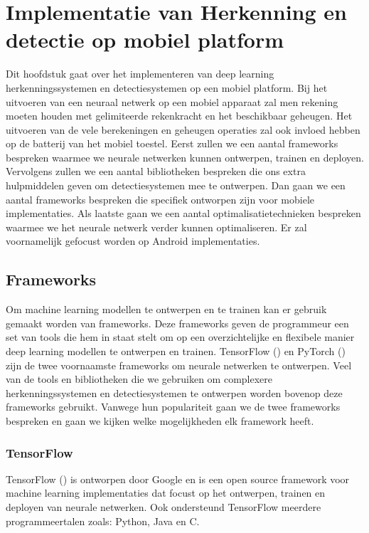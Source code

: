 \chapter{Implementatie van Herkenning en detectie op mobiel platform}
Dit hoofdstuk gaat over het implementeren van deep learning herkenningssystemen en detectiesystemen op een mobiel platform.
Bij het uitvoeren van een neuraal netwerk op een mobiel apparaat zal men rekening moeten houden met gelimiteerde rekenkracht en het beschikbaar geheugen.
Het uitvoeren van de vele berekeningen en geheugen operaties zal ook invloed hebben op de batterij van het mobiel toestel.
Eerst zullen we een aantal frameworks bespreken waarmee we neurale netwerken kunnen ontwerpen, trainen en deployen.
Vervolgens zullen we een aantal bibliotheken bespreken die ons extra hulpmiddelen geven om detectiesystemen mee te ontwerpen.
Dan gaan we een aantal frameworks bespreken die specifiek ontworpen zijn voor mobiele implementaties.
Als laatste gaan we een aantal optimalisatietechnieken bespreken waarmee we het neurale netwerk verder kunnen optimaliseren.
Er zal voornamelijk gefocust worden op Android implementaties.

\section{Frameworks}
Om machine learning modellen te ontwerpen en te trainen kan er gebruik gemaakt worden van frameworks.
Deze frameworks geven de programmeur een set van tools die hem in staat stelt om op een overzichtelijke en flexibele manier deep learning modellen te ontwerpen en trainen.
TensorFlow (\cite{abadi_tensorflow_2016}) en PyTorch (\cite{li_PyTorch_2020}) zijn de twee voornaamste frameworks om neurale netwerken te ontwerpen.
Veel van de tools en bibliotheken die we gebruiken om complexere herkenningssystemen en detectiesystemen te ontwerpen worden bovenop deze frameworks gebruikt.
Vanwege hun populariteit gaan we de twee frameworks bespreken en gaan we kijken welke mogelijkheden elk framework heeft.

\subsection{TensorFlow}
TensorFlow (\cite{abadi_tensorflow_2016}) is ontworpen door Google en is een open source framework voor machine learning implementaties dat focust op het ontwerpen, trainen en deployen van neurale netwerken.
Ook ondersteund TensorFlow meerdere programmeertalen zoals: Python, Java en C.

